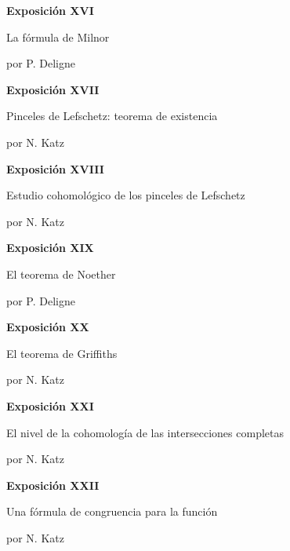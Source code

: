 \medskip
\noindent\textbf{Exposición XVI}\par
\noindent\hspace*{2em}La fórmula de Milnor\par
\noindent\hspace*{2em}por P. Deligne\par
\medskip
\noindent\textbf{Exposición XVII}\par
\noindent\hspace*{2em}Pinceles de Lefschetz: teorema de existencia\par
\noindent\hspace*{2em}por N. Katz\par
\medskip
\noindent\textbf{Exposición XVIII}\par
\noindent\hspace*{2em}Estudio cohomológico de los pinceles de Lefschetz\par
\noindent\hspace*{2em}por N. Katz\par
\medskip
\noindent\textbf{Exposición XIX}\par
\noindent\hspace*{2em}El teorema de Noether\par
\noindent\hspace*{2em}por P. Deligne\par
\medskip
\noindent\textbf{Exposición XX}\par
\noindent\hspace*{2em}El teorema de Griffiths\par
\noindent\hspace*{2em}por N. Katz\par

\clearpage
\noindent\textbf{Exposición XXI}\par
\noindent\hspace*{2em}El nivel de la cohomología de las intersecciones completas\par
\noindent\hspace*{2em}por N. Katz\par
\medskip
\noindent\textbf{Exposición XXII}\par
\noindent\hspace*{2em}Una fórmula de congruencia para la función\par
\noindent\hspace*{2em}por N. Katz\par

\clearpage
